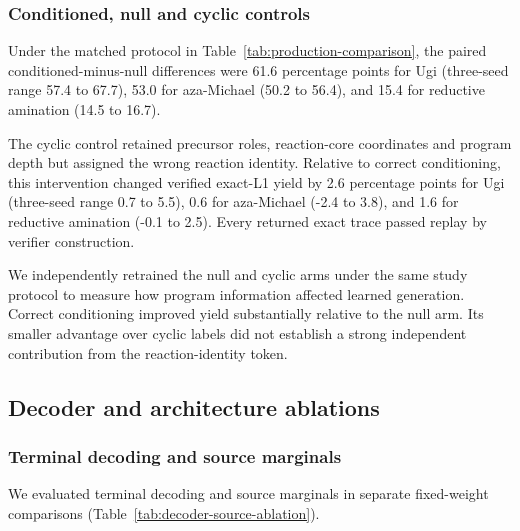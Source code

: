 \documentclass{article}
\theoremstyle{definition}
\newcommand{\ForgeTableOneCyclicBLDifferencePP}{0.6}
\newcommand{\ForgeTableOneCyclicBLRangeHighPP}{3.8}
\newcommand{\ForgeTableOneCyclicBLRangeLowPP}{-2.4}
\newcommand{\ForgeTableOneCyclicLXDifferencePP}{1.6}
\newcommand{\ForgeTableOneCyclicLXRangeHighPP}{2.5}
\newcommand{\ForgeTableOneCyclicLXRangeLowPP}{-0.1}
\newcommand{\ForgeTableOneCyclicUgiDifferencePP}{2.6}
\newcommand{\ForgeTableOneCyclicUgiRangeHighPP}{5.5}
\newcommand{\ForgeTableOneCyclicUgiRangeLowPP}{0.7}
\newcommand{\ForgeTableOneNullBLDifferencePP}{53.0}
\newcommand{\ForgeTableOneNullBLRangeHighPP}{56.4}
\newcommand{\ForgeTableOneNullBLRangeLowPP}{50.2}
\newcommand{\ForgeTableOneNullLXDifferencePP}{15.4}
\newcommand{\ForgeTableOneNullLXRangeHighPP}{16.7}
\newcommand{\ForgeTableOneNullLXRangeLowPP}{14.5}
\newcommand{\ForgeTableOneNullUgiDifferencePP}{61.6}
\newcommand{\ForgeTableOneNullUgiRangeHighPP}{67.7}
\newcommand{\ForgeTableOneNullUgiRangeLowPP}{57.4}
\begin{document}
\subsubsection{Conditioned, null and cyclic controls}

Under the matched protocol in Table~\ref{tab:production-comparison}, the paired
conditioned-minus-null differences were
\ForgeTableOneNullUgiDifferencePP{} percentage points for Ugi (three-seed range
\ForgeTableOneNullUgiRangeLowPP{} to \ForgeTableOneNullUgiRangeHighPP{}),
\ForgeTableOneNullBLDifferencePP{} for aza-Michael (\ForgeTableOneNullBLRangeLowPP{} to
\ForgeTableOneNullBLRangeHighPP{}), and \ForgeTableOneNullLXDifferencePP{} for reductive amination
(\ForgeTableOneNullLXRangeLowPP{} to \ForgeTableOneNullLXRangeHighPP{}).

The cyclic control retained precursor roles, reaction-core coordinates and program depth but assigned
the wrong reaction identity.
Relative to correct conditioning, this intervention changed verified exact-L1 yield by
\ForgeTableOneCyclicUgiDifferencePP{} percentage points for Ugi (three-seed range
\ForgeTableOneCyclicUgiRangeLowPP{} to \ForgeTableOneCyclicUgiRangeHighPP{}),
\ForgeTableOneCyclicBLDifferencePP{} for aza-Michael (\ForgeTableOneCyclicBLRangeLowPP{} to
\ForgeTableOneCyclicBLRangeHighPP{}), and \ForgeTableOneCyclicLXDifferencePP{} for reductive
amination (\ForgeTableOneCyclicLXRangeLowPP{} to \ForgeTableOneCyclicLXRangeHighPP{}). Every
returned exact trace passed replay by verifier construction.

We independently retrained the null and cyclic arms under the same study protocol to measure how
program information affected learned generation. Correct conditioning improved yield substantially
relative to the null arm. Its smaller advantage over cyclic labels did not establish a strong
independent contribution from the reaction-identity token.

\FloatBarrier
\subsection{Decoder and architecture ablations}
\label{app:ablation-results}

\subsubsection{Terminal decoding and source marginals}

We evaluated terminal decoding and source marginals in separate fixed-weight comparisons
(Table~\ref{tab:decoder-source-ablation}).
\end{document}
